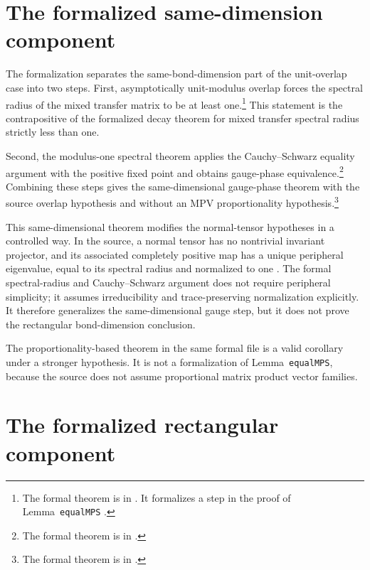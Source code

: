 \documentclass{article}
\begin{document}
\section{The formalized same-dimension component}

The formalization separates the same-bond-dimension part of the unit-overlap
case into two steps. First, asymptotically unit-modulus overlap forces the
spectral radius of the mixed transfer matrix to be at least one.\footnote{The
formal theorem is
in . It formalizes a
step in the proof of Lemma~\texttt{equalMPS}
\cite[lines~1093--1117]{Cirac2016MPDO_arXiv}.}
This statement is the contrapositive of the formalized decay theorem for mixed
transfer spectral radius strictly less than one.

Second, the modulus-one spectral theorem applies the Cauchy--Schwarz equality
argument with the positive fixed point and obtains gauge-phase
equivalence.\footnote{The formal theorem is
in .}
Combining these steps gives the same-dimensional gauge-phase theorem with the
source overlap hypothesis and without an MPV proportionality
hypothesis.\footnote{The formal theorem is
in .}

This same-dimensional theorem modifies the normal-tensor hypotheses in a
controlled way. In the source, a normal tensor has no nontrivial invariant
projector, and its associated completely positive map has a unique peripheral
eigenvalue, equal to its spectral radius and normalized to one
\cite{Cirac2016MPDO_arXiv}. The formal spectral-radius and Cauchy--Schwarz
argument does not require peripheral simplicity; it assumes irreducibility and
trace-preserving normalization explicitly. It therefore generalizes the
same-dimensional gauge step, but it does not prove the rectangular
bond-dimension conclusion.

The proportionality-based theorem in the same formal file is a valid corollary
under a stronger hypothesis. It is not a formalization of
Lemma~\texttt{equalMPS}, because the source does not assume proportional
matrix product vector families.

\section{The formalized rectangular component}
\end{document}
